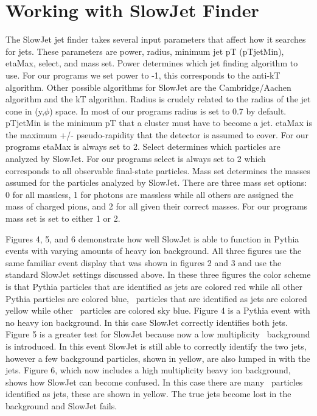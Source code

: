 \documentclass[11pt]{article}
\begin{document}
\section{Working with SlowJet Finder}
%
%
The SlowJet jet finder takes several input parameters that affect how it searches for jets. These parameters are power, radius, minimum jet pT (pTjetMin), etaMax, select, and mass set. Power determines which jet finding algorithm to use. For our programs we set power to -1, this corresponds to the anti-kT algorithm. Other possible algorithms for SlowJet are the Cambridge/Aachen algorithm and the kT algorithm. Radius is crudely related to the radius of the jet cone in (y,$\phi$) space. In most of our programs radius is set to 0.7 by default. pTjetMin is the minimum pT that a cluster must have to become a jet. etaMax is the maximum +/- pseudo-rapidity that the detector is assumed to cover. For our programs etaMax is always set to 2. Select determines which particles are analyzed by SlowJet. For our programs select is always set to 2 which corresponds to all observable final-state particles. Mass set determines the masses assumed for the particles analyzed by SlowJet. There are three mass set options: 0 for all massless, 1 for photons are massless while all others are assigned the mass of charged pions, and 2 for all given their correct masses. For our programs mass set is set to either 1 or 2.

Figures 4, 5, and 6 demonstrate how well SlowJet is able to function in Pythia events with varying amounts of heavy ion background. All three figures use the same familiar event display that was shown in figures 2 and 3 and use the standard SlowJet settings discussed above. In these three figures the color scheme is that Pythia particles that are identified as jets are colored red while all other Pythia particles are colored blue, \trento\ particles that are identified as jets are colored yellow while other \trento\ particles are colored sky blue. Figure 4 is a Pythia event with no heavy ion background. In this case SlowJet correctly identifies both jets. Figure 5 is a greater test for SlowJet because now a low multiplicity \trento\ background is introduced. In this event SlowJet is still able to correctly identify the two jets, however a few background particles, shown in yellow, are also lumped in with the jets. Figure 6, which now includes a high multiplicity heavy ion background, shows how SlowJet can become confused. In this case there are many \trento\ particles identified as jets, these are shown in yellow. The true jets become lost in the background and SlowJet fails.
\end{document}
